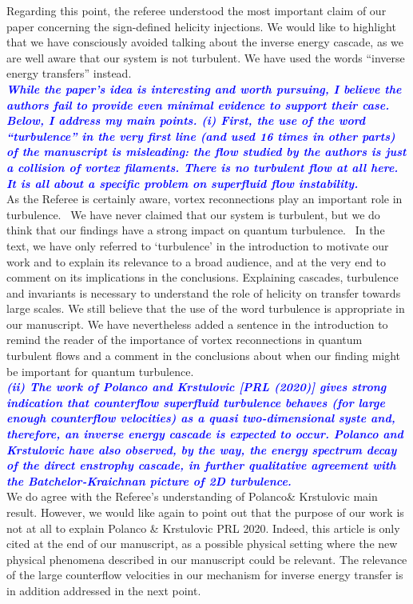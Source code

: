 \documentclass[a4paper,10pt]{article}
\def\blue#1{\textcolor{blue}{#1}}
\def\refcomment#1{\textbf{\blue{\emph{#1}}}\\}
\begin{document}
Regarding this point, the referee understood the most important claim of our paper concerning the sign-defined helicity injections. We would like to highlight that we have consciously avoided talking about the inverse energy cascade, as we are well aware that our system is not turbulent. We have used the words “inverse energy transfers” instead.\\

\refcomment{While the paper’s idea is interesting and worth pursuing, I believe the authors fail to provide even minimal evidence to support their case. Below, I address my main points.
(i) First, the use of the word “turbulence” in the very first line (and used 16 times in other parts) of the manuscript is misleading: the flow studied by the authors is just a collision of vortex filaments. There is no turbulent flow at all here. It is all about a specific problem on superfluid flow instability.}

As the Referee is certainly aware, vortex reconnections play an important role in turbulence.  We have never claimed that our system is turbulent, but we do think that our findings have a strong impact on quantum turbulence.  In the text, we have only referred to `turbulence' in the introduction to motivate our work and to explain its relevance to a broad audience, and at the very end to comment on its implications in the conclusions. Explaining cascades, turbulence and invariants is necessary to understand the role of helicity on transfer towards large scales. We still believe that the use of the word turbulence is appropriate in our manuscript. We have nevertheless added a sentence in the introduction to remind the reader of the importance of vortex reconnections in quantum turbulent flows and a comment in the conclusions about when our finding might be important for quantum turbulence. \\

\refcomment{(ii) The work of Polanco and Krstulovic [PRL (2020)] gives strong indication that counterflow superfluid turbulence behaves (for large enough counterflow velocities) as a quasi two-dimensional syste and, therefore, an inverse energy cascade is expected to occur. Polanco and Krstulovic have also observed, by the way, the energy spectrum decay of the direct enstrophy cascade, in further qualitative agreement with the Batchelor-Kraichnan picture of 2D turbulence.}

We do agree with the Referee’s understanding of Polanco\& Krstulovic main result. 
However, we would like again to point out that the purpose of our work is not at all to explain Polanco \& Krstulovic PRL 2020. Indeed, this article is only cited at the end of our manuscript, as a possible physical setting where the new physical phenomena described in our manuscript could be relevant. The relevance of the large counterflow velocities in our mechanism for inverse energy transfer is in addition addressed in the next point.
 
\end{document}
